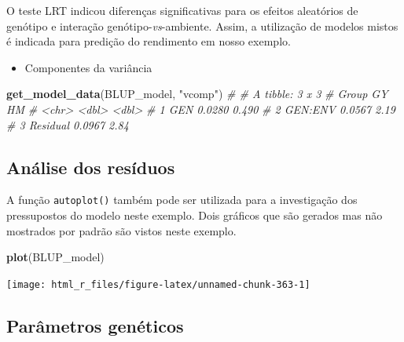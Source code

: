 \documentclass[
]{book}
\newenvironment{Shaded}{\begin{snugshade}}{\end{snugshade}}
\newcommand{\CommentTok}[1]{\textcolor[rgb]{0.56,0.35,0.01}{\textit{#1}}}
\newcommand{\KeywordTok}[1]{\textcolor[rgb]{0.13,0.29,0.53}{\textbf{#1}}}
\newcommand{\NormalTok}[1]{#1}
\newcommand{\StringTok}[1]{\textcolor[rgb]{0.31,0.60,0.02}{#1}}
\providecommand{\tightlist}{%
  \setlength{\itemsep}{0pt}\setlength{\parskip}{0pt}}
\numberwithin{equation}{section}
\newcommand{\indt}[1]{\index{#1|ST}}
\begin{document}
O teste LRT \indt{LRT} indicou diferenças significativas para os efeitos aleatórios de genótipo e interação genótipo-\emph{vs}-ambiente. Assim, a utilização de modelos mistos é indicada para predição do rendimento em nosso exemplo.

\begin{itemize}
\tightlist
\item
  Componentes da variância
\end{itemize}

\begin{Shaded}
\begin{Highlighting}[]
\KeywordTok{get\_model\_data}\NormalTok{(BLUP\_model, }\StringTok{"vcomp"}\NormalTok{)}
\CommentTok{\# \# A tibble: 3 x 3}
\CommentTok{\#   Group        GY    HM}
\CommentTok{\#   \textless{}chr\textgreater{}     \textless{}dbl\textgreater{} \textless{}dbl\textgreater{}}
\CommentTok{\# 1 GEN      0.0280 0.490}
\CommentTok{\# 2 GEN:ENV  0.0567 2.19 }
\CommentTok{\# 3 Residual 0.0967 2.84}
\end{Highlighting}
\end{Shaded}

\hypertarget{anuxe1lise-dos-resuxedduos-2}{%
\subsection{Análise dos resíduos}\label{anuxe1lise-dos-resuxedduos-2}}

A função \texttt{autoplot()} também pode ser utilizada para a investigação dos pressupostos do modelo neste exemplo. Dois gráficos que são gerados mas não mostrados por padrão são vistos neste exemplo.

\begin{Shaded}
\begin{Highlighting}[]
\KeywordTok{plot}\NormalTok{(BLUP\_model)}
\end{Highlighting}
\end{Shaded}

\begin{center}\texttt{[image: html\_r\_files/figure-latex/unnamed-chunk-363-1]} \end{center}

\hypertarget{paruxe2metros-genuxe9ticos}{%
\subsection{Parâmetros genéticos}\label{paruxe2metros-genuxe9ticos}}
\end{document}
